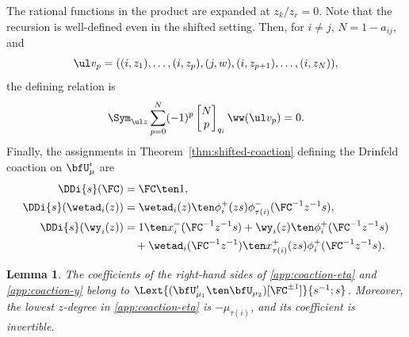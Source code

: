 \documentclass[reqno]{amsart}
\numberwithin{equation}{section}
\newtheorem*{lemma}{Lemma}
\begin{document}
The rational functions in the product are expanded at $z_k/z_r=0$.  
Note that the recursion is well-defined even in the shifted setting.
Then, for $i\ne j$, 
$N=1-a_{ij}$, and
\[
\ul v_p=((i,z_1),\ldots,(i,z_p),(j,w),
(i,z_{p+1}),\ldots,(i,z_N)),
\]
the defining relation is
\begin{equation}
	\Sym_{\ul z}\sum_{p=0}^{N}(-1)^p
	\begin{bmatrix}N\\p\end{bmatrix}_{q_i}\ww(\ul v_p)=0.
	\label{app:iota-serre}
\end{equation}
Finally, the assignments in Theorem~\ref{thm:shifted-coaction} defining the Drinfeld coaction on $\bfU^\imath_\mu$ are
\begin{align}
	\DDi{s}(\FC)&=\FC\ten1,\label{app:coaction-zeta}\\
	\DDi{s}(\wetad_i(z))
	&=\wetad_i(z)\ten
	\phi_i^+(zs)\phi_{\tau(i)}^-({\FC^{-1}z^{-1}} s),\label{app:coaction-eta}\\
	\DDi{s}(\wy_i(z))
	&=1\ten x_i^-({\FC^{-1}z^{-1}} s)+\wy_i(z)\ten\phi_i^+({\FC^{-1}z^{-1}} s)\notag\\
	&\quad+\wetad_i({\FC^{-1}z^{-1}})\ten x_{\tau(i)}^+(zs)\phi_i^+({\FC^{-1}z^{-1}} s).
	\label{app:coaction-y}
\end{align}

\begin{lemma}\label{app:completion-lemma}
	The coefficients of the right-hand sides of \eqref{app:coaction-eta} and 
	\eqref{app:coaction-y} belong to
	$\Lext{(\bfU^\imath_{\mu_1}\ten\bfU_{\mu_2})[\FC^{\pm1}]}{s^{-1};s}$.
	Moreover, the lowest $z$-degree in \eqref{app:coaction-eta} is $-\mu_{\tau(i)}$, and its 
	coefficient is invertible.
\end{lemma}
\end{document}

